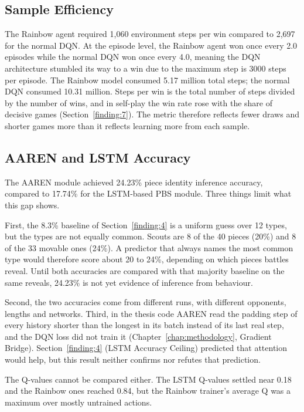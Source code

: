 \subsection{Sample Efficiency}\label{finding:10}
The Rainbow agent required 1,060 environment steps per win compared to 2,697 for the normal DQN. At the episode level, the Rainbow agent won once every 2.0 episodes while the normal DQN won once every 4.0, meaning the DQN architecture stumbled its way to a win due to the maximum step is 3000 steps per episode. The Rainbow model consumed 5.17 million total steps; the normal DQN consumed 10.31 million. Steps per win is the total number of steps divided by the number of wins, and in self-play the win rate rose with the share of decisive games (Section~\ref{finding:7}). The metric therefore reflects fewer draws and shorter games more than it reflects learning more from each sample.

\subsection{AAREN and LSTM Accuracy}\label{finding:11}
The AAREN module achieved 24.23\% piece identity inference accuracy, compared to 17.74\% for the LSTM-based PBS module. Three things limit what this gap shows.

First, the 8.3\% baseline of Section~\ref{finding:4} is a uniform guess over 12 types, but the types are not equally common. Scouts are 8 of the 40 pieces (20\%) and 8 of the 33 movable ones (24\%). A predictor that always names the most common type would therefore score about 20 to 24\%, depending on which pieces battles reveal. Until both accuracies are compared with that majority baseline on the same reveals, 24.23\% is not yet evidence of inference from behaviour.

Second, the two accuracies come from different runs, with different opponents, lengths and networks. Third, in the thesis code AAREN read the padding step of every history shorter than the longest in its batch instead of its last real step, and the DQN loss did not train it (Chapter~\ref{chap:methodology}, Gradient Bridge). Section~\ref{finding:4} (LSTM Accuracy Ceiling) predicted that attention would help, but this result neither confirms nor refutes that prediction.

The Q-values cannot be compared either. The LSTM Q-values settled near 0.18 and the Rainbow ones reached 0.84, but the Rainbow trainer's average Q was a maximum over mostly untrained actions.

